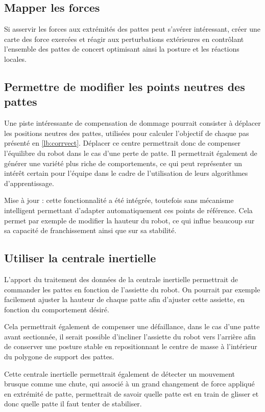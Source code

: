 \documentclass{tnreport}
\begin{document}
\subsection{Mapper les forces}
Si asservir les forces aux extrémités des pattes peut s'avérer intéressant, créer une carte des force exercées et réagir aux perturbations extérieures en contrôlant l'ensemble des pattes de concert optimisant ainsi la posture et les réactions locales. 

\subsection{Permettre de modifier les points neutres des pattes}
Une piste intéressante de compensation de dommage pourrait consister à déplacer les positions neutres des pattes, utilisées pour calculer l'objectif de chaque pas présenté en \ref{lb:corrvect}. Déplacer ce centre permettrait donc de compenser l'équilibre du robot dans le cas d'une perte de patte. Il permettrait également de générer une variété plus riche de comportements, ce qui peut représenter un intérêt certain pour l'équipe dans le cadre de l'utilisation de leurs algorithmes d'apprentissage.

Mise à jour : cette fonctionnalité a été intégrée, toutefois sans mécanisme intelligent permettant d'adapter automatiquement ces points de référence. Cela permet par exemple de modifier la hauteur du robot, ce qui influe beaucoup sur sa capacité de franchissement ainsi que sur sa stabilité.

\subsection{Utiliser la centrale inertielle}
L'apport du traitement des données de la centrale inertielle permettrait de commander les pattes en fonction de l'assiette du robot. On pourrait par exemple facilement ajuster la hauteur de chaque patte afin d'ajuster cette assiette, en fonction du comportement désiré. 

Cela permettrait également de compenser une défaillance, dans le cas d'une patte avant sectionnée, il serait possible d'incliner l'assiette du robot vers l'arrière afin de conserver une posture stable en repositionnant le centre de masse à l'intérieur du polygone de support des pattes. 

Cette centrale inertielle permettrait également de détecter un mouvement brusque comme une chute, qui associé à un grand changement de force appliqué en extrémité de patte, permettrait de savoir quelle patte est en train de glisser et donc quelle patte il faut tenter de stabiliser.
\end{document}
